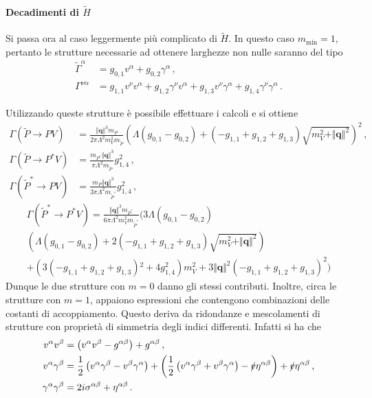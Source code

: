\documentclass{article}
\begin{document}
\paragraph{Decadimenti di $\tilde{H}$}
Si passa ora al caso leggermente più complicato di $\tilde{H}$. In questo caso $m_\text{min} = 1$, pertanto le strutture necessarie ad ottenere larghezze non nulle saranno del tipo
\begin{align}
  \tilde{\Gamma}^\alpha &= g_{0,1} v^\alpha + g_{0,2} \gamma^\alpha \, , \\
  \Gamma^{\nu \alpha} &= g_{1,1} v^\nu v^\alpha + g_{1,2} \gamma^\nu v^\alpha + g_{1,3} v^\nu \gamma^\alpha + g_{1,4} \gamma^\nu \gamma^\alpha \, .
\end{align}

Utilizzando queste strutture è possibile effettuare i calcoli e si ottiene
\begin{align}
  \Gamma\left( \tilde{P} \to P V \right) &=  \frac{\Vert \mathbf{q} \Vert^3 m_P}{2 \pi \Lambda^2 m_V^2 m_{\tilde{P}}} \left(\Lambda \left(g_{0,1}-g_{0,2}\right)+\left(-g_{1,1}+g_{1,2}+g_{1,3}\right) \sqrt{m_V^2+\Vert \mathbf{q}\Vert^2}\right)^2\, , \\
  \Gamma\left( \tilde{P} \to P^* V \right) &= \frac{m_{P^*} \Vert \mathbf{q} \Vert^3}{\pi  \Lambda ^2 m_{\tilde{P}}} g_{1,4}^2 \, , \\
  \Gamma\left( \tilde{P}^* \to P V \right) &= \frac{m_P \Vert \mathbf{q} \Vert^3}{3 \pi  \Lambda ^2 m_{\tilde{P}^*}} g_{1,4}^2 \, , 
\end{align}
\begin{multline}
  \Gamma\left( \tilde{P}^* \to P^* V \right) = \frac{\Vert\mathbf{q}\Vert^3 m_{P^*}}{6 \pi \Lambda ^2 m_V^2 m_{\tilde{P}^*}} \Bigg(3 \Lambda \left(g_{0,1}-g_{0,2}\right)  \\
    \left(\Lambda \left( g_{0,1}-g_{0,2}\right)+2 \left(-g_{1,1}+g_{1,2}+g_{1,3}\right) \sqrt{m_V^2+\Vert\mathbf{q}\Vert^2}\right) \\
 + \left(3 \left(-g_{1,1}+g_{1,2}+g_{1,3}\right){}^2+4 g_{1,4}^2\right) m_V^2+3 \Vert\mathbf{q}\Vert^2 \left(-g_{1,1}+g_{1,2}+g_{1,3}\right)^2\Bigg)
\end{multline}
Dunque le due strutture con $m=0$ danno gli stessi contributi. Inoltre, circa le strutture con $m = 1$, appaiono espressioni che contengono combinazioni delle costanti di accoppiamento. Questo deriva da ridondanze e mescolamenti di strutture con proprietà di simmetria degli indici differenti. Infatti si ha che
\begin{align}
  v^\alpha v^\beta &= \left( v^\alpha v^\beta - g^{\alpha \beta} \right) + g^{\alpha \beta} \, , \\
  v^\alpha \gamma^\beta &= \frac{1}{2} \left( v^\alpha \gamma^\beta - v^\beta \gamma^\alpha \right) + \left( \frac{1}{2} \left( v^\alpha \gamma^\beta + v^\beta \gamma^\alpha \right) - \slashed{v} \eta^{\alpha \beta} \right) + \slashed{v} \eta^{\alpha \beta} \, ,\\
  \gamma^\alpha \gamma^\beta &= 2 i \sigma^{\alpha \beta} + \eta^{\alpha \beta} \, .
\end{align}
\end{document}

